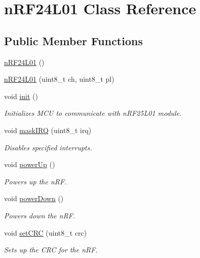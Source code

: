 \hypertarget{classn_r_f24_l01}{\section{n\-R\-F24\-L01 Class Reference}
\label{classn_r_f24_l01}
}
\subsection*{Public Member Functions}
\begin{DoxyCompactItemize}
\item 
\hyperlink{classn_r_f24_l01_a4392a317b65252b3d620a6c557f5f148}{n\-R\-F24\-L01} ()
\item 
\hyperlink{classn_r_f24_l01_aa436e2da2244f8b76c102683272d5fa8}{n\-R\-F24\-L01} (uint8\-\_\-t ch, uint8\-\_\-t pl)
\item 
void \hyperlink{classn_r_f24_l01_a46c2fc5ad6598ededbecdbcb2cee5209}{init} ()
\begin{DoxyCompactList}\small\item\em Initializes M\-C\-U to communicate with n\-R\-F25\-L01 module. \end{DoxyCompactList}\item 
void \hyperlink{classn_r_f24_l01_a83264df097487d6d4ecb2b35bb94f8ab}{mask\-I\-R\-Q} (uint8\-\_\-t irq)
\begin{DoxyCompactList}\small\item\em Disables specified interrupts. \end{DoxyCompactList}\item 
void \hyperlink{classn_r_f24_l01_a764e54b67b24aeffea0876141725b492}{power\-Up} ()
\begin{DoxyCompactList}\small\item\em Powers up the n\-R\-F. \end{DoxyCompactList}\item 
void \hyperlink{classn_r_f24_l01_ab24900f30e454d1b8658aed8951e5c0a}{power\-Down} ()
\begin{DoxyCompactList}\small\item\em Powers down the n\-R\-F. \end{DoxyCompactList}\item 
void \hyperlink{classn_r_f24_l01_a5b915f035b128a17b4d625a99870c66e}{set\-C\-R\-C} (uint8\-\_\-t crc)
\begin{DoxyCompactList}\small\item\em Sets up the C\-R\-C for the n\-R\-F. \end{DoxyCompactList}\item 

\end{DoxyCompactItemize}
